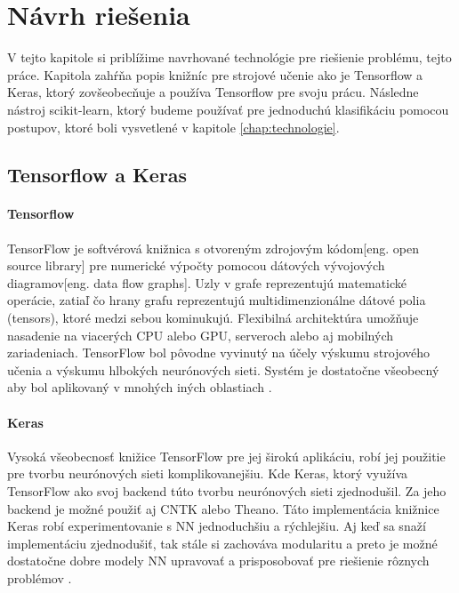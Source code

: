 \chapter{Návrh riešenia}

V tejto kapitole si priblížime navrhované technológie pre riešienie problému, tejto práce.
Kapitola zahŕňa popis knižníc pre strojové učenie ako je Tensorflow a Keras, ktorý zovšeobecňuje a používa Tensorflow pre svoju prácu.
Následne nástroj scikit-learn, ktorý budeme používať pre jednoduchú klasifikáciu pomocou postupov, ktoré boli vysvetlené v kapitole \ref{chap:technologie}.

\section{Tensorflow a Keras}
\label{sec:TensorflowKeras}

\subsubsection{Tensorflow}
TensorFlow je softvérová knižnica s otvoreným zdrojovým kódom[eng. open source library] pre numerické výpočty pomocou dátových vývojových diagramov[eng. data flow graphs].
Uzly v grafe reprezentujú matematické operácie, zatiaľ čo hrany grafu reprezentujú multidimenzionálne dátové polia (tensors), ktoré medzi sebou kominukujú.
Flexibilná architektúra umožňuje nasadenie na viacerých CPU alebo GPU, serveroch alebo aj mobilných zariadeniach.
TensorFlow bol pôvodne vyvinutý na účely výskumu strojového učenia a výskumu hlbokých neurónových sieti.
Systém je dostatočne všeobecný aby bol aplikovaný v mnohých iných oblastiach \cite{odkaz:TensorFlow}.

\subsubsection{Keras}
Vysoká všeobecnosť knižice TensorFlow pre jej širokú aplikáciu, robí jej použitie pre tvorbu neurónových sieti komplikovanejšiu.
Kde Keras, ktorý využíva TensorFlow ako svoj backend túto tvorbu neurónových sieti zjednodušil.
Za jeho backend je možné použiť aj CNTK alebo Theano.
Táto implementácia knižnice Keras robí experimentovanie s NN jednoduchšiu a rýchlejšiu.
Aj keď sa snaží implementáciu zjednodušiť, tak stále si zachováva modularitu a preto je možné dostatočne dobre modely NN upravovať a prisposobovať pre riešienie rôznych problémov \cite{odkaz:Keras}.


